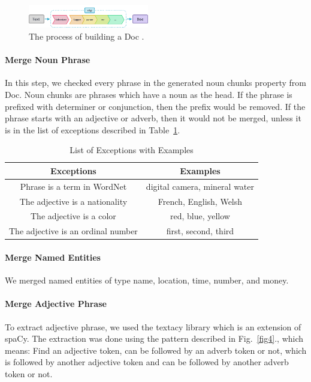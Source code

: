 \documentclass[a4paper,conference]{IEEEtran}
\begin{document}
\begin{figure}[htbp]
\centerline{\includegraphics[width=0.47\textwidth]{fig3.png}}
\caption{The process of building a Doc \cite{b18}.}
\label{fig3}
\end{figure}

\paragraph{Merge Noun Phrase}
In this step, we checked every phrase in the generated noun chunks property from Doc. Noun chunks are phrases which have a noun as the head. If the phrase is prefixed with determiner or conjunction, then the prefix would be removed. If the phrase starts with an adjective or adverb, then it would not be merged, unless it is in the list of exceptions described in Table~\ref{tab1}. 

\begin{table}[htbp]
\caption{List of Exceptions with Examples}
\begin{center}
\begin{tabular}{|c|c|}
\hline
\textbf{Exceptions} & \textbf{Examples}\\
\hline
Phrase is a term in WordNet&digital camera, mineral water\\
\hline
The adjective is a nationality&French, English, Welsh\\
\hline
The adjective is a color&red, blue, yellow\\
\hline
The adjective is an ordinal number&first, second, third\\
\hline
\end{tabular}
\label{tab1}
\end{center}
\end{table}

\paragraph{Merge Named Entities}
We merged named entities of type name, location, time, number, and money.

\paragraph{Merge Adjective Phrase}
To extract adjective phrase, we used the textacy library which is an extension of spaCy. The extraction was done using the pattern described in Fig.~\ref{fig4}., which means: Find an adjective token, can be followed by an adverb token or not, which is followed by another adjective token and can be followed by another adverb token or not.
\end{document}
